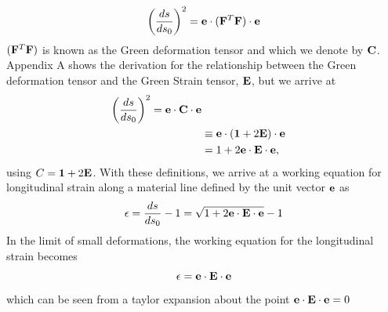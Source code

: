 \begin{equation}
\label{eq:dsds022}
 \left(\frac{ds}{ds_0}\right)^2
 = {\mathbf e} \cdot ({\mathbf F}^{T} {\mathbf F}) \cdot {\mathbf e} \\
 \end{equation}
 $({\mathbf F}^{T} {\mathbf F})$ is known as the Green deformation tensor and which we denote by ${\bf{C}}$.  
 Appendix A shows the derivation for the relationship between the Green deformation tensor and the Green Strain tensor, ${\bf{E}}$, but we arrive at  
 \begin{equation}
 \begin{split}
 \left(\frac{ds}{ds_0}\right)^2 = {\mathbf e} \cdot {\mathbf C} \cdot {\mathbf e} \\
 &\equiv {\mathbf e} \cdot ({\mathbf 1} + 2{\mathbf E}) \cdot {\mathbf e}  \\
 &= 1 + 2{\mathbf e} \cdot {\mathbf E} \cdot {\mathbf e},
\end{split}
\end{equation}
using $C = {\mathbf 1} + 2{\mathbf E}$.
With these definitions, we arrive at a working equation for longitudinal strain along a material line defined by the
unit vector ${\mathbf e}$ as 
\begin{equation}
\label{eq:longstrain2}
  \epsilon 
  = \frac{ds}{ds_0} - 1
  = \sqrt{ 1 + 2{\bf{e}}\cdot \bf{E} \cdot \bf{e}} - 1
\end{equation}
In the limit of small deformations, the working equation for the longitudinal strain becomes
\begin{equation} 
\label{eq:small}
  \epsilon = {\mathbf e} \cdot {\mathbf E} \cdot {\mathbf e}
\end{equation}
which can be seen from a taylor expansion about the point ${\mathbf e} \cdot {\mathbf E} \cdot {\mathbf e} = 0$
